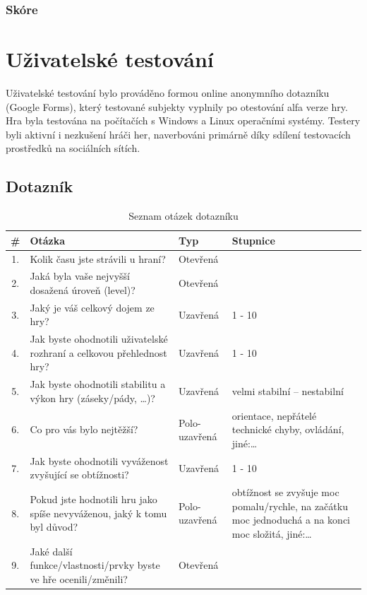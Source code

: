 \subsection*{Skóre}

\chapter{Uživatelské testování}\label{chap:Uživatelské testování}
Uživatelské testování bylo prováděno formou online anonymního dotazníku (Google Forms), který testované subjekty vyplnily po otestování alfa verze hry. Hra byla testována na počítačích s Windows a Linux operačními systémy. Testery byli aktivní i nezkušení hráči her, naverbováni primárně díky sdílení testovacích prostředků na sociálních sítích.
\section{Dotazník}

\begin{table}[h]
    \centering
    \renewcommand{\arraystretch}{1.3}
    \begin{tabularx}{\textwidth}{c|X|l|X}
    \hline
    \textbf{\#} & \textbf{Otázka} & \textbf{Typ} & \textbf{Stupnice} \\ \hline
    1. & Kolik času jste strávili u hraní? & Otevřená & \\ 
    2. & Jaká byla vaše nejvyšší dosažená úroveň (level)? & Otevřená &  \\ 
    3. & Jaký je váš celkový dojem ze hry? & Uzavřená &  1 - 10 \\ 
    4. & Jak byste ohodnotili uživatelské rozhraní a celkovou přehlednost hry? & Uzavřená & 1 - 10\\ 
    5. & Jak byste ohodnotili stabilitu a výkon hry (záseky/pády, \ldots)? & Uzavřená & velmi stabilní – nestabilní\\ 
    6. & Co pro vás bylo nejtěžší? & Polo-uzavřená & orientace, nepřátelé technické chyby, ovládání, jiné:\ldots \\ 
    7. & Jak byste ohodnotili vyváženost zvyšující se obtížnosti? & Uzavřená &  1 - 10 \\ 
    8. & Pokud jste hodnotili hru jako spíše nevyváženou, jaký k tomu byl důvod? & Polo-uzavřená & obtížnost se zvyšuje moc pomalu/rychle, na začátku moc jednoduchá a na konci moc složitá, jiné:\ldots \\ 
    9. & Jaké další funkce/vlastnosti/prvky byste ve hře ocenili/změnili? & Otevřená & \\
    \hline
    \end{tabularx}
    \caption{Seznam otázek dotazníku}
    \label{tab:questions}
\end{table}

